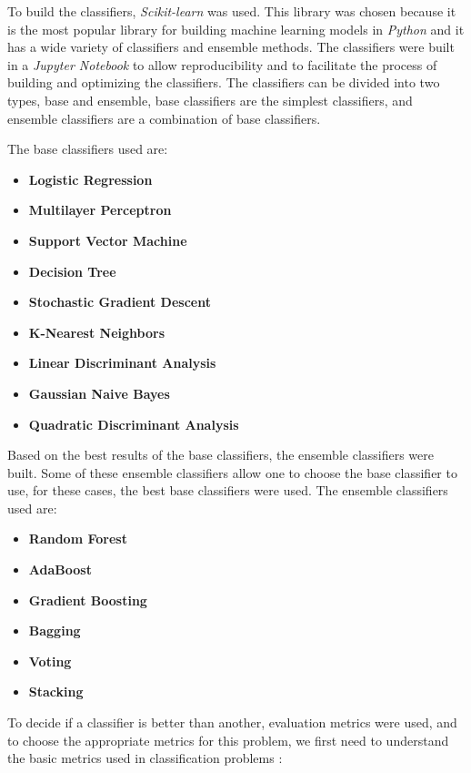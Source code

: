 To build the classifiers, \textit{Scikit-learn} was used. This library was chosen because it is the most popular library for building machine learning models in \textit{Python} and it has a wide variety of classifiers and ensemble methods. The classifiers were built in a \textit{Jupyter Notebook} to allow reproducibility and to facilitate the process of building and optimizing the classifiers. The classifiers can be divided into two types, base and ensemble, base classifiers are the simplest classifiers, and ensemble classifiers are a combination of base classifiers.

The base classifiers used are:
\begin{itemize}
    \item \textbf{Logistic Regression}
    \item \textbf{Multilayer Perceptron}
    \item \textbf{Support Vector Machine}
    \item \textbf{Decision Tree}
    \item \textbf{Stochastic Gradient Descent}
    \item \textbf{K-Nearest Neighbors}
    \item \textbf{Linear Discriminant Analysis}
    \item \textbf{Gaussian Naive Bayes}
    \item \textbf{Quadratic Discriminant Analysis}
\end{itemize}

Based on the best results of the base classifiers, the ensemble classifiers were built. Some of these ensemble classifiers allow one to choose the base classifier to use, for these cases, the best base classifiers were used. The ensemble classifiers used are:
\begin{itemize}
    \item \textbf{Random Forest}
    \item \textbf{AdaBoost}
    \item \textbf{Gradient Boosting}
    \item \textbf{Bagging}
    \item \textbf{Voting}
    \item \textbf{Stacking}
\end{itemize}

To decide if a classifier is better than another, evaluation metrics were used, and to choose the appropriate metrics for this problem, we first need to understand the basic metrics used in classification problems \cite{m_review_2015}:

